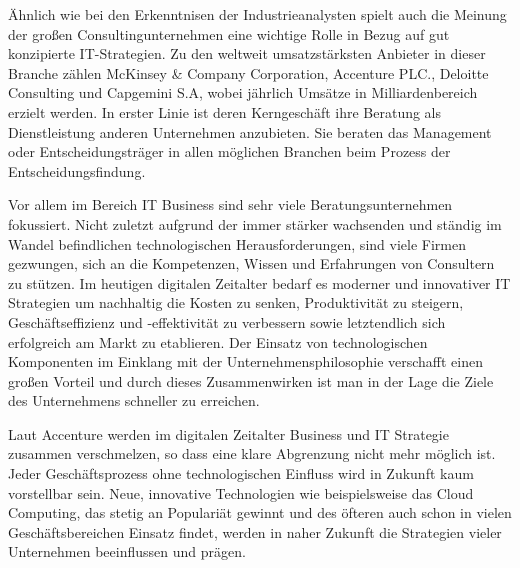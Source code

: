 Ähnlich wie bei den Erkenntnisen der Industrieanalysten spielt auch die Meinung der großen Consultingunternehmen eine wichtige Rolle in Bezug auf gut konzipierte IT-Strategien. Zu den weltweit umsatzstärksten Anbieter in dieser Branche zählen McKinsey \& Company Corporation, Accenture PLC., Deloitte Consulting und Capgemini S.A, wobei jährlich Umsätze in Milliardenbereich erzielt werden. In erster Linie ist deren Kerngeschäft ihre Beratung als Dienstleistung anderen Unternehmen anzubieten. Sie beraten das Management oder Entscheidungsträger in allen möglichen Branchen beim Prozess der Entscheidungsfindung.

Vor allem im Bereich IT Business sind sehr viele Beratungsunternehmen fokussiert. Nicht zuletzt aufgrund der immer stärker wachsenden und ständig im Wandel befindlichen technologischen Herausforderungen, sind viele Firmen gezwungen, sich an die Kompetenzen, Wissen und Erfahrungen von Consultern zu stützen. Im heutigen digitalen Zeitalter bedarf es moderner und innovativer IT Strategien um nachhaltig die Kosten zu senken, Produktivität zu steigern, Geschäftseffizienz und -effektivität zu verbessern sowie letztendlich sich erfolgreich am Markt zu etablieren. Der Einsatz von technologischen Komponenten im Einklang mit der Unternehmensphilosophie verschafft einen großen Vorteil und durch dieses Zusammenwirken ist man in der Lage die Ziele des Unternehmens schneller zu erreichen. 

Laut Accenture werden im digitalen Zeitalter Business und IT Strategie zusammen verschmelzen, so dass eine klare Abgrenzung nicht mehr möglich ist. Jeder Geschäftsprozess ohne technologischen Einfluss wird in Zukunft kaum vorstellbar sein. Neue, innovative Technologien wie beispielsweise das Cloud Computing, das stetig an Populariät gewinnt und des öfteren auch schon in vielen Geschäftsbereichen Einsatz findet, werden in naher Zukunft die Strategien vieler Unternehmen beeinflussen und prägen.\cite{AccentureConsulting}